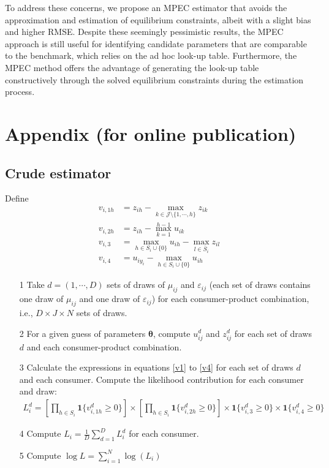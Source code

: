 \documentclass[12pt]{article}
\renewcommand*{\epsilon}{\varepsilon}
\begin{document}
To address these concerns, we propose an MPEC estimator that avoids the approximation and estimation of equilibrium constraints, albeit with a slight bias and higher RMSE. Despite these seemingly pessimistic results, the MPEC approach is still useful for identifying candidate parameters that are comparable to the benchmark, which relies on the ad hoc look-up table. Furthermore, the MPEC method offers the advantage of generating the look-up table constructively through the solved equilibrium constraints during the estimation process.





\newpage
\appendix
\section{Appendix (for online publication)}

\subsection{Crude estimator}

Define
\begin{align}
    v_{i,1h} &= z_{ih} - \max_{k \in \mathcal{J}\setminus \{1,\cdots,h\}} z_{ik} \label{v1}\\
    v_{i,2h} &=  z_{ih} - \max_{k = 1}^{h-1} u_{ik} \label{v2} \\
    v_{i,3} &= \max_{h \in S_i \cup \{0\}} u_{ih} - \max_{l \in \bar{S}_i} z_{il} \label{v3}\\
    v_{i,4} &= u_{iy_i} - \max_{h \in S_i \cup \{0\}} u_{ih}  \label{v4}
\end{align}

\begin{itemize}
    \item[1] Take $d = (1, \cdots, D)$ sets of draws of $\mu_{ij}$ and $\epsilon_{ij}$ (each set of draws contains one draw of $\mu_{ij}$ and one draw of $\epsilon_{ij}$) for each consumer-product combination, i.e., $D\times J \times N$ sets of draws.
    \item[2] For a given guess of parameters $\bm{\theta}$, compute $u^d_{ij}$ and $z^d_{ij}$ for each set of draws $d$ and each consumer-product combination.
    \item[3] Calculate the expressions in equations \eqref{v1} to \eqref{v4} for each set of draws $d$ and each consumer. Compute the likelihood contribution for each consumer and draw:
    \begin{align*}
        L_i^d = \left[\prod_{h \in S_i} \bm{1}\{v^d_{i,1h} \geq 0\} \right] \times \left[\prod_{h \in S_i} \bm{1}\{v^d_{i,2h} \geq 0\} \right] \times  \bm{1}\{v^d_{i,3} \geq 0\}  \times  \bm{1}\{v^d_{i,4} \geq 0\}
    \end{align*}
    \item[4] Compute $L_i = \frac{1}{D}\sum_{d = 1}^D L_i^d$ for each consumer.
    \item[5] Compute $\log L = \sum_{i = 1}^N \log(L_i)$
\end{itemize}
\end{document}
